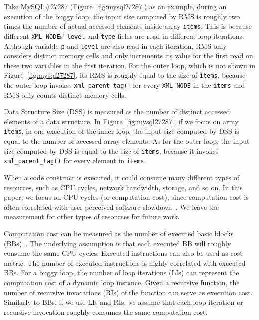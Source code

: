Take MySQL\#27287 (Figure~\ref{fig:mysql27287}) as an example, 
during an execution of the buggy loop, the input size
computed by RMS is roughly 
two times the number of actual accessed elements inside array \texttt{items}. 
This is because different \texttt{XML\_NODE}s' \texttt{level} and \texttt{type} 
fields are read in different loop iterations. 
Although variable \texttt{p} and \texttt{level} are also read in each iteration,
RMS only considers distinct memory cells and 
only increments its value for the first read on these 
two variables in the first iteration. 
For the outer loop, which is not shown in Figure~\ref{fig:mysql27287}, 
its RMS is roughly equal to the size of \texttt{items}, 
because the outer loop invokes \texttt{xml\_parent\_tag()} for every
\texttt{XML\_NODE} in the \texttt{items} and RMS only 
counts distinct memory cells. 


Data Structure Size (DSS) is measured as
the number of distinct accessed elements of a data structure.  
%
In Figure~\ref{fig:mysql27287}, if we focus on array \texttt{items},
in one execution of the inner loop, the input size computed by DSS 
is equal to the number of accessed array elements. 
As for the outer loop, the input size computed by DSS  is
equal to the size of  \texttt{items}, because
it invokes \texttt{xml\_parent\_tag()} for every element in \texttt{items}.


When a code construct is executed,
it could consume many different types of resources, 
such as CPU cycles, network bandwidth, storage, and so on.
In this paper, we focus on CPU cycles (or computation cost), 
since computation cost is often correlated 
with user-perceived software slowdown~\cite{SongOOPSLA2014}.
We leave the measurement for other types of 
resources for future work.


Computation cost can be measured 
as the number of executed basic blocks (BBs)~\cite{Aprof1,Aprof2}.
The underlying assumption is that each executed 
BB will roughly consume the same CPU cycles. 
Executed instructions can also be used as cost metric. 
The number of executed instructions is highly correlated with executed BBs.
For a buggy loop, the number of loop iterations (LIs) can represent 
the computation cost of a dynamic loop instance.
Given a recursive function, the number of recursive invocations (RIs) 
of the function can serve as execution cost.
Similarly to BBs, if we use LIs and RIs, 
we assume that each loop iteration or recursive invocation 
roughly consumes the same computation cost. 



